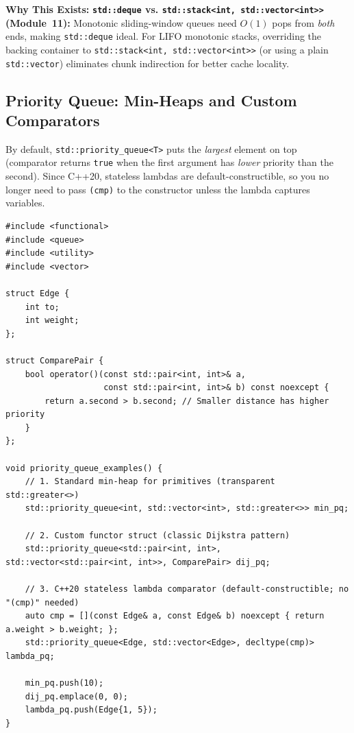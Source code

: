\documentclass[11pt,a4paper]{article}
\newcommand{\whybeat}{\textbf{\color{accentteal}Why This Exists:} }
\begin{document}
\whybeat \textbf{\texttt{std::deque} vs. \texttt{std::stack<int, std::vector<int>>} (Module~11):} Monotonic sliding-window queues need $O(1)$ pops from \emph{both} ends, making \texttt{std::deque} ideal. For LIFO monotonic stacks, overriding the backing container to \texttt{std::stack<int, std::vector<int>>} (or using a plain \texttt{std::vector}) eliminates chunk indirection for better cache locality.

\subsection{Priority Queue: Min-Heaps and Custom Comparators}

By default, \texttt{std::priority\_queue<T>} puts the \emph{largest} element on top (comparator returns \texttt{true} when the first argument has \emph{lower} priority than the second). Since C++20, stateless lambdas are default-constructible, so you no longer need to pass \texttt{(cmp)} to the constructor unless the lambda captures variables.

\begin{lstlisting}[caption={Min-heap and custom comparator patterns for \texttt{std::priority\_queue}}]
#include <functional>
#include <queue>
#include <utility>
#include <vector>

struct Edge {
    int to;
    int weight;
};

struct ComparePair {
    bool operator()(const std::pair<int, int>& a,
                    const std::pair<int, int>& b) const noexcept {
        return a.second > b.second; // Smaller distance has higher priority
    }
};

void priority_queue_examples() {
    // 1. Standard min-heap for primitives (transparent std::greater<>)
    std::priority_queue<int, std::vector<int>, std::greater<>> min_pq;

    // 2. Custom functor struct (classic Dijkstra pattern)
    std::priority_queue<std::pair<int, int>, std::vector<std::pair<int, int>>, ComparePair> dij_pq;

    // 3. C++20 stateless lambda comparator (default-constructible; no "(cmp)" needed)
    auto cmp = [](const Edge& a, const Edge& b) noexcept { return a.weight > b.weight; };
    std::priority_queue<Edge, std::vector<Edge>, decltype(cmp)> lambda_pq;

    min_pq.push(10);
    dij_pq.emplace(0, 0);
    lambda_pq.push(Edge{1, 5});
}
\end{lstlisting}

\end{document}
